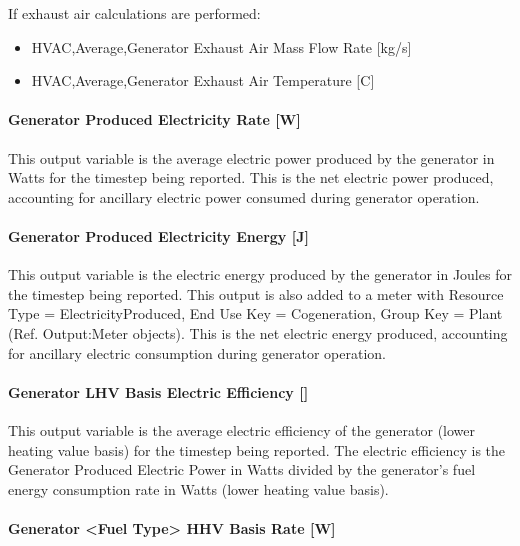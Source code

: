If exhaust air calculations are performed:

\begin{itemize}
\item
  HVAC,Average,Generator Exhaust Air Mass Flow Rate {[}kg/s{]}
\item
  HVAC,Average,Generator Exhaust Air Temperature {[}C{]}
\end{itemize}

\paragraph{Generator Produced Electricity Rate {[}W{]}}\label{generator-produced-electric-power-w-1}

This output variable is the average electric power produced by the generator in Watts for the timestep being reported. This is the net electric power produced, accounting for ancillary electric power consumed during generator operation.

\paragraph{Generator Produced Electricity Energy {[}J{]}}\label{generator-produced-electric-energy-j-1}

This output variable is the electric energy produced by the generator in Joules for the timestep being reported. This output is also added to a meter with Resource Type = ElectricityProduced, End Use Key = Cogeneration, Group Key = Plant (Ref. Output:Meter objects). This is the net electric energy produced, accounting for ancillary electric consumption during generator operation.

\paragraph{Generator LHV Basis Electric Efficiency {[]}}\label{generator-lhv-basis-electric-efficiency}

This output variable is the average electric efficiency of the generator (lower heating value basis) for the timestep being reported. The electric efficiency is the Generator Produced Electric Power in Watts divided by the generator's fuel energy consumption rate in Watts (lower heating value basis).

\paragraph{Generator \textless{}Fuel Type\textgreater{} HHV Basis Rate {[}W{]}}\label{generator-fuel-type-hhv-basis-rate-w}

